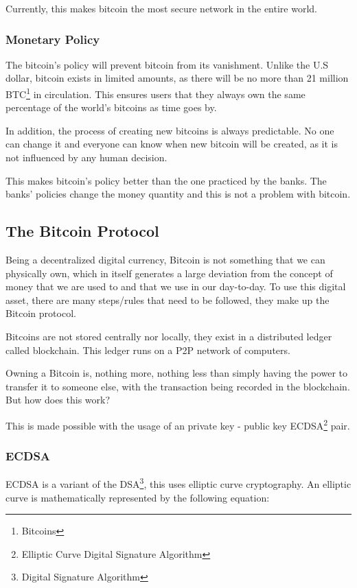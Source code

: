 \documentclass{article}
\newcommand\tab[1][1cm]{\hspace*{#1}}
\begin{document}
 Currently, this makes bitcoin the most secure network in the entire world. 
 
\subsubsection{Monetary Policy}

\tab The bitcoin's policy will prevent bitcoin from its vanishment. Unlike the U.S dollar, bitcoin exists in limited amounts, as there will be no more than 21 million BTC\footnote{Bitcoins} in circulation. This ensures users that they always own the same percentage of the world's bitcoins as time goes by.

In addition, the process of creating new bitcoins is always predictable. No one can change it and everyone can know when new bitcoin will be created, as it is not influenced by any human decision. 

This makes bitcoin's policy better than the one practiced by the banks. The banks' policies change the money quantity and this is not a problem with bitcoin.

\subsection{The Bitcoin Protocol}

\tab Being a decentralized digital currency, Bitcoin is not something that we can physically own, which in itself generates a large deviation from the concept of money that we are used to and that we use in our day-to-day. To use this digital asset, there are many steps/rules that need to be followed, they make up the Bitcoin protocol.

Bitcoins are not stored centrally nor locally, they exist in a distributed ledger called blockchain. This ledger runs on a P2P network of computers. 

Owning a Bitcoin is, nothing more, nothing less than simply having the power to transfer it to someone else, with the transaction being recorded in the blockchain. But how does this work?

This is made possible with the usage of an private key - public key ECDSA\footnote{Elliptic Curve Digital Signature Algorithm} pair.

\subsubsection{ECDSA}

\tab ECDSA is a variant of the DSA\footnote{Digital Signature Algorithm}, this uses elliptic curve cryptography. An elliptic curve is mathematically represented by the following equation:
\end{document}
